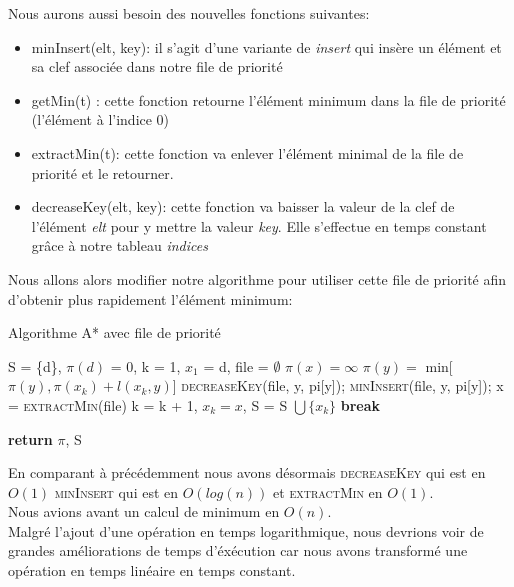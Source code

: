 \documentclass{article}
\begin{document}
Nous aurons aussi besoin des nouvelles fonctions suivantes:
\begin{itemize}
	\item minInsert(elt, key): il s'agit d'une variante de \textit{insert} qui insère un 
		élément et sa clef associée dans notre file de priorité
	\item getMin(t) : cette fonction retourne l'élément minimum dans la file de priorité (l'élément
		à l'indice 0)
	\item extractMin(t): cette fonction va enlever l'élément minimal de la file de priorité
			et le retourner.
	\item decreaseKey(elt, key): cette fonction va baisser la valeur de la clef de l'élément \textit{elt}
			pour y mettre la valeur \textit{key}. Elle s'effectue en temps constant grâce à notre 
			tableau \textit{indices}\\
\end{itemize}

Nous allons alors modifier notre algorithme pour utiliser cette file de priorité afin d'obtenir
plus rapidement l'élément minimum:

\clearpage

\begin{algorithm}
\caption{Algorithme A* avec file de priorité}\label{astar_pq}
\begin{algorithmic}[1]
	\State S = \{d\}, $\pi(d)$ = 0, k = 1, $x_1$ = d, file = $\emptyset$
		\State $\pi(x) = \infty$
	\EndFor
			\State $\pi(y) = $ min[$\pi(y), \pi(x_k) + l(x_k, y)$]
				\State \textsc{decreaseKey}(file, y, pi[y]);
			\Else
				\State \textsc{minInsert}(file, y, pi[y]);
			\EndIf
		\EndFor
		\State x = \textsc{extractMin}(file)  
		\State k = k + 1, $x_k = x$, S = S $\bigcup \{x_k\}$
			\State \textbf{break}
		\EndIf
	\EndWhile
	
	\State \textbf{return} $\pi$, S
\EndProcedure 

\end{algorithmic}
\end{algorithm}

En comparant à précédemment nous avons désormais \textsc{decreaseKey} qui est en $O(1)$
\textsc{minInsert} qui est en $O(log(n))$ et \textsc{extractMin} en $O(1)$.\\
Nous avions avant un calcul de minimum en $O(n)$.\\
Malgré l'ajout d'une opération en temps logarithmique, nous devrions voir de grandes 
améliorations de temps d'éxécution car nous avons transformé une opération en temps linéaire en
temps constant.
\end{document}
